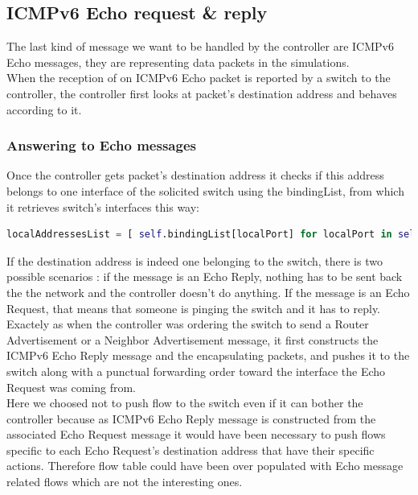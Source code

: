 \documentclass{article}
\begin{document}
\subsection{ICMPv6 Echo request \& reply}

The last kind of message we want to be handled by the controller are
ICMPv6 Echo messages, they are representing data packets in the
simulations. \\
When the reception of on ICMPv6 Echo packet is reported
by a switch to the controller, the controller first looks at packet's
destination address and behaves according to it.

\subsubsection{Answering to Echo messages}
Once the controller gets packet's destination address it checks if
this address belongs to one interface of the solicited switch using
the bindingList, from which it retrieves switch's interfaces this way:

\begin{lstlisting}[frame=single,language=Python, breaklines=true] 
localAddressesList = [ self.bindingList[localPort] for localPort in self.bindingList.keys() if localPort[0]==dpid ]
\end{lstlisting}

If the destination address is indeed one belonging to the switch,
there is two possible scenarios : if the message is an Echo Reply,
nothing has to be sent back the the network and the controller
doesn't do anything. If the message is an Echo Request, that means
that someone is pinging the switch and it has to reply.\\
\newline
Exactely as when the controller was ordering the switch to send a
Router Advertisement or a Neighbor Advertisement message, it first
constructs the ICMPv6 Echo Reply message and the encapsulating
packets, and pushes it to the switch along with a punctual forwarding
order toward the interface the Echo Request was coming from.\\
\newline
Here we choosed not to push flow to the switch even if it can bother
the controller because as ICMPv6 Echo Reply message is constructed from
the associated Echo Request message it would have been necessary to
push flows specific to each Echo Request's destination address that
have their specific actions. Therefore flow table could have been
over populated with Echo message related flows which are not the
interesting ones.
\end{document}
